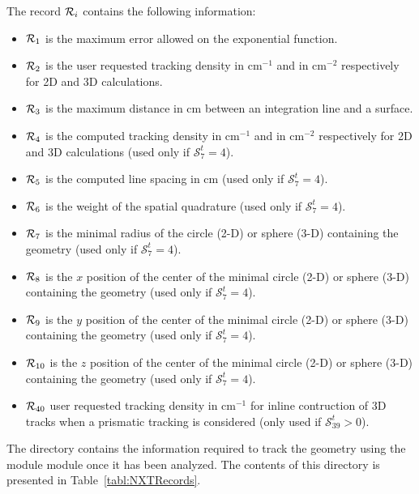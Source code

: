 The record ${\cal R}_i$ contains the following information:
\begin{itemize}
\item ${\cal R}_1$ is the maximum error allowed on the exponential function. 
\item ${\cal R}_2$ is the user requested tracking density in cm$^{-1}$ and in cm$^{-2}$ respectively for 2D and 3D calculations. 
\item ${\cal R}_3$ is the maximum distance in cm between an integration line and a surface. 
\item ${\cal R}_4$ is the computed tracking density in cm$^{-1}$ and in cm$^{-2}$ respectively for 2D and 3D calculations (used 
only if $\mathcal{S}^{t}_{7}=4$).
\item ${\cal R}_5$ is the computed line spacing in cm (used only if $\mathcal{S}^{t}_{7}=4$). 
\item ${\cal R}_6$ is the weight of the spatial quadrature (used only if $\mathcal{S}^{t}_{7}=4$). 
\item ${\cal R}_7$ is the minimal radius of the circle (2-D) or sphere (3-D) containing the geometry (used only if $\mathcal{S}^{t}_{7}=4$). 
\item ${\cal R}_8$ is the $x$ position of the center of the minimal circle (2-D) or sphere (3-D) containing the geometry (used 
only if $\mathcal{S}^{t}_{7}=4$). 
\item ${\cal R}_9$ is the $y$ position of the center of the minimal circle (2-D) or sphere (3-D) containing the geometry (used 
only if $\mathcal{S}^{t}_{7}=4$). 
\item ${\cal R}_{10}$ is the $z$ position of the center of the minimal circle (2-D) or sphere (3-D) containing the geometry (used 
only if $\mathcal{S}^{t}_{7}=4$). 
\item ${\cal R}_{40}$ user requested tracking density in cm$^{-1}$ for inline contruction of 3D tracks when a prismatic tracking is considered (only used if $\mathcal{S}^{t}_{39}>0$).
\end{itemize}

The  directory contains the information required to track the geometry using the  module module once it has been analyzed. The contents of this directory is presented in Table~\ref{tabl:NXTRecords}.

